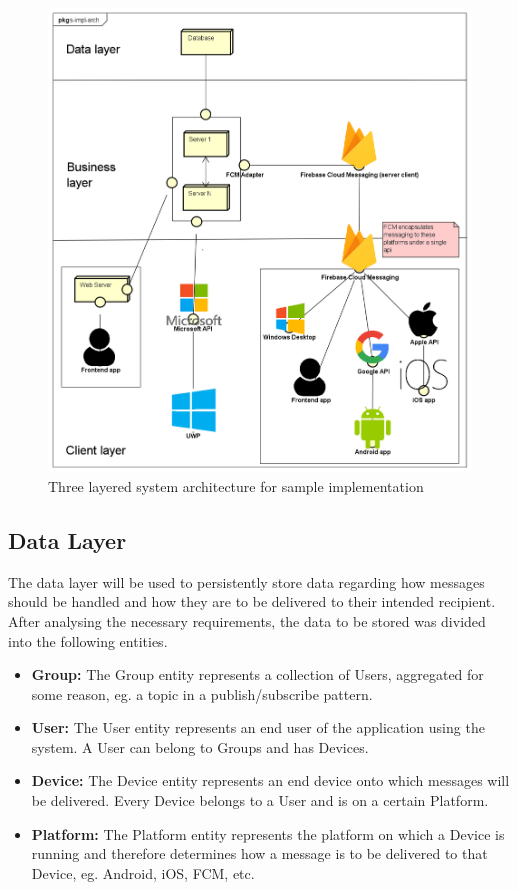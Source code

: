 \begin{figure}[H]
	\centering
	\includegraphics[width=1\textwidth]{figures/03_design/s-impl-arch}
    \caption{Three layered system architecture for sample implementation}
    \label{fig:s-impl-arch}
\end{figure}

\subsection{Data Layer} \label{design:data-layer}
The data layer will be used to persistently store data regarding how messages should be handled and how they are to be delivered to their intended recipient. After analysing the necessary requirements, the data to be stored was divided into the following entities.
\begin{itemize}
\item \textbf{Group:} The Group entity represents a collection of Users, aggregated for some reason, eg. a topic in a publish/subscribe pattern.
\item \textbf{User:} The User entity represents an end user of the application using the system. A User can belong to Groups and has Devices.
\item \textbf{Device:} The Device entity represents an end device onto which messages will be delivered. Every Device belongs to a User and is on a certain Platform.
\item \textbf{Platform:} The Platform entity represents the platform on which a Device is running and therefore determines how a message is to be delivered to that Device, eg. Android, iOS, FCM, etc.
\end{itemize}

